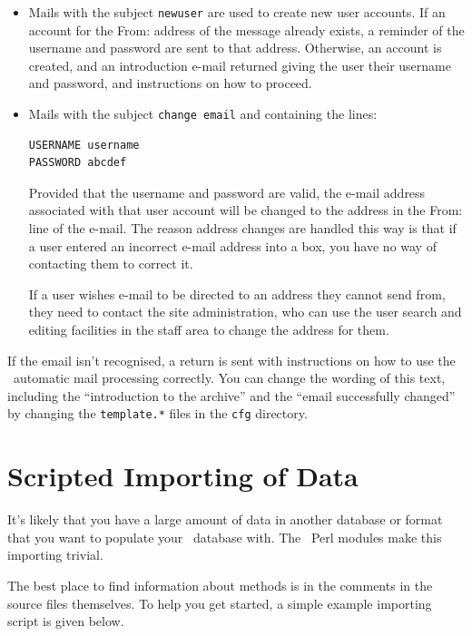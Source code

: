 \begin{itemize}
\item Mails with the subject {\tt newuser} are used to create new user accounts. If an account for the From: address of the message already exists, a reminder of the username and password are sent to that address. Otherwise, an account is created, and an introduction e-mail returned giving the user their username and password, and instructions on how to proceed.
\item Mails with the subject {\tt change email} and containing the lines:

\begin{verbatim}
USERNAME username
PASSWORD abcdef
\end{verbatim}

Provided that the username and password are valid, the e-mail address associated with that user account will be changed to the address in the From: line of the e-mail. The reason address changes are handled this way is that if a user entered an incorrect e-mail address into a box, you have no way of contacting them to correct it.

If a user wishes e-mail to be directed to an address they cannot send from, they need to contact the site administration, who can use the user search and editing facilities in the staff area to change the address for them.
\end{itemize}

If the email isn't recognised, a return is sent with instructions on how to use the \eprints\ automatic mail processing correctly. You can change the wording of this text, including the ``introduction to the archive'' and the ``email successfully changed'' by changing the {\tt template.*} files in the {\tt cfg} directory.


\section{Scripted Importing of Data}

It's likely that you have a large amount of data in another database or format that you want to populate your \eprints\ database with. The \eprints\ Perl modules make this importing trivial.

The best place to find information about methods is in the comments in the source files themselves. To help you get started, a simple example importing script is given below.

